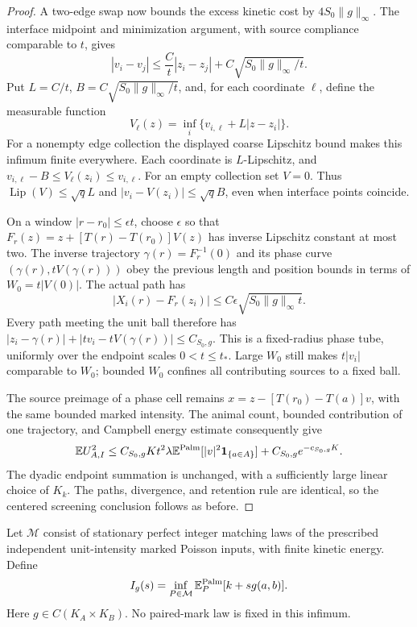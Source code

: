 \documentclass[11pt,reqno]{amsart}
\theoremstyle{definition}
\theoremstyle{remark}
\numberwithin{equation}{section}
\newcommand{\E}{\mathbb E}
\begin{document}
\begin{proof}
A two-edge swap now bounds the excess kinetic cost by
\(4S_0\|g\|_\infty\). The interface midpoint and minimization
argument, with source compliance comparable to \(t\), gives
\[
|v_i-v_j|\le \frac C t|z_i-z_j|
                  +C\sqrt{S_0\|g\|_\infty/t}.
\]
Put \(L=C/t\), \(B=C\sqrt{S_0\|g\|_\infty/t}\), and,
for each coordinate \(\ell\), define the measurable function
\[
V_\ell(z)=\inf_i\{v_{i,\ell}+L|z-z_i|\}.
\]
For a nonempty edge collection the displayed coarse Lipschitz bound
makes this infimum finite everywhere. Each coordinate is
\(L\)-Lipschitz, and
\(v_{i,\ell}-B\le V_\ell(z_i)\le v_{i,\ell}\).
For an empty collection set \(V=0\). Thus
\(\operatorname{Lip}(V)\le\sqrt q L\) and
\(|v_i-V(z_i)|\le\sqrt q B\), even when interface points coincide.

On a window \(|r-r_0|\le\epsilon t\), choose \(\epsilon\)
so that \(F_r(z)=z+[T(r)-T(r_0)]V(z)\) has inverse Lipschitz
constant at most two. The inverse trajectory
\(\gamma(r)=F_r^{-1}(0)\) and its phase curve
\((\gamma(r),tV(\gamma(r)))\) obey the previous length and
position bounds in terms of \(W_0=t|V(0)|\). The actual path has
\[
|X_i(r)-F_r(z_i)|\le C\epsilon\sqrt{S_0\|g\|_\infty t}.
\]
Every path meeting the unit ball therefore has
\(|z_i-\gamma(r)|+|tv_i-tV(\gamma(r))|\le C_{S_0,g}\).
This is a fixed-radius phase tube, uniformly over the endpoint
scales \(0<t\le t_*\). Large \(W_0\) still makes
\(t|v_i|\) comparable to \(W_0\); bounded \(W_0\) confines
all contributing sources to a fixed ball.

The source preimage of a phase cell remains
\(x=z-[T(r_0)-T(a)]v\), with the same bounded marked intensity.
The animal count, bounded contribution of one trajectory, and
Campbell energy estimate consequently give
\[
\E U_{A,I}^2\le C_{S_0,g}Kt^2\lambda
             \E^{\rm Palm}[|v|^2\mathbf1_{\{a\in A\}}]
                       +C_{S_0,g}e^{-c_{S_0,g}K}.
\]
The dyadic endpoint summation is unchanged, with a sufficiently
large linear choice of \(K_k\). The paths, divergence, and
retention rule are identical, so the centered screening conclusion
follows as before.
\end{proof}

Let \(\mathcal M\) consist of stationary perfect integer matching
laws of the prescribed independent unit-intensity marked Poisson
inputs, with finite kinetic energy. Define
\[
I_g(s)=\inf_{P\in\mathcal M}
               \E_P^{\rm Palm}[k+s g(a,b)].
\]
Here \(g\in C(K_A\times K_B)\). No paired-mark law is fixed
in this infimum.
\end{document}

